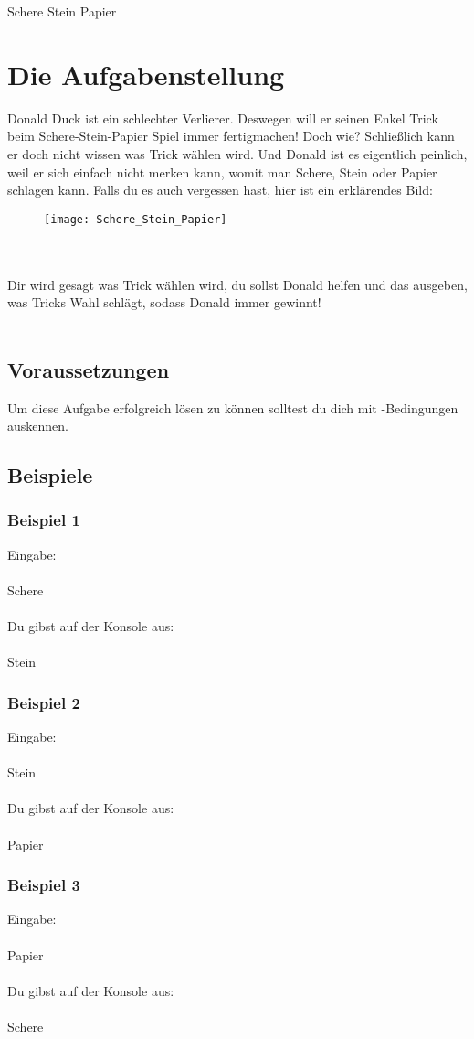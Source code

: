 \documentclass{\VorlagenPfad/coderdojokatext}
\newcommand{\Titel}{Schere Stein Papier}
\begin{document}
	\setcounter{chapter}{1}
	
	\begin{center}
		{\huge \Titel}
	\end{center}
	
	\section{Die Aufgabenstellung} Donald Duck ist ein schlechter Verlierer. Deswegen will er seinen Enkel Trick beim Schere-Stein-Papier Spiel immer fertigmachen! Doch wie? Schließlich kann er doch nicht wissen was Trick wählen wird. Und Donald ist es eigentlich peinlich, weil er sich einfach nicht merken kann, womit man Schere, Stein oder Papier schlagen kann. Falls du es auch vergessen hast, hier ist ein erklärendes Bild:
	\\
	\begin{figure}[h]
	\texttt{[image: Schere\_Stein\_Papier]}
	\centering
	\end{figure}
	\\ \\
	Dir wird gesagt was Trick wählen wird, du sollst Donald helfen und das ausgeben, was Tricks Wahl schlägt, sodass Donald immer gewinnt!
	\\ \\
	
	\subsection{Voraussetzungen} Um diese Aufgabe erfolgreich lösen zu können solltest du dich mit -Bedingungen auskennen.
	
	\newpage
	
	\subsection{Beispiele}
	\subsubsection{Beispiel 1}
	Eingabe: \\ \\
	Schere
	\\ \\
	Du gibst auf der Konsole aus: \\ \\
	Stein
	
	\subsubsection{Beispiel 2}
	Eingabe: \\ \\
	Stein
	\\ \\
	Du gibst auf der Konsole aus: \\ \\
	Papier
	
	\subsubsection{Beispiel 3}
	Eingabe: \\ \\
	Papier
	\\ \\
	Du gibst auf der Konsole aus: \\ \\
	Schere
	
\end{document}
